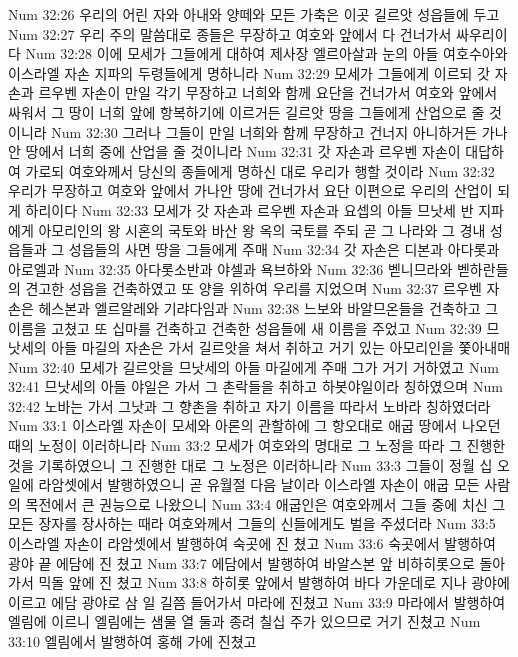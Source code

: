 Num 32:26  우리의 어린 자와 아내와 양떼와 모든 가축은 이곳 길르앗 성읍들에 두고
Num 32:27  우리 주의 말씀대로 종들은 무장하고 여호와 앞에서 다 건너가서 싸우리이다
Num 32:28  이에 모세가 그들에게 대하여 제사장 엘르아살과 눈의 아들 여호수아와 이스라엘 자손 지파의 두령들에게 명하니라
Num 32:29  모세가 그들에게 이르되 갓 자손과 르우벤 자손이 만일 각기 무장하고 너희와 함께 요단을 건너가서 여호와 앞에서 싸워서 그 땅이 너희 앞에 항복하기에 이르거든 길르앗 땅을 그들에게 산업으로 줄 것이니라
Num 32:30  그러나 그들이 만일 너희와 함께 무장하고 건너지 아니하거든 가나안 땅에서 너희 중에 산업을 줄 것이니라
Num 32:31  갓 자손과 르우벤 자손이 대답하여 가로되 여호와께서 당신의 종들에게 명하신 대로 우리가 행할 것이라
Num 32:32  우리가 무장하고 여호와 앞에서 가나안 땅에 건너가서 요단 이편으로 우리의 산업이 되게 하리이다
Num 32:33  모세가 갓 자손과 르우벤 자손과 요셉의 아들 므낫세 반 지파에게 아모리인의 왕 시혼의 국토와 바산 왕 옥의 국토를 주되 곧 그 나라와 그 경내 성읍들과 그 성읍들의 사면 땅을 그들에게 주매
Num 32:34  갓 자손은 디본과 아다롯과 아로엘과
Num 32:35  아다롯소반과 야셀과 욕브하와
Num 32:36  벧니므라와 벧하란들의 견고한 성읍을 건축하였고 또 양을 위하여 우리를 지었으며
Num 32:37  르우벤 자손은 헤스본과 엘르알레와 기랴다임과
Num 32:38  느보와 바알므온들을 건축하고 그 이름을 고쳤고 또 십마를 건축하고 건축한 성읍들에 새 이름을 주었고
Num 32:39  므낫세의 아들 마길의 자손은 가서 길르앗을 쳐서 취하고 거기 있는 아모리인을 쫓아내매
Num 32:40  모세가 길르앗을 므낫세의 아들 마길에게 주매 그가 거기 거하였고
Num 32:41  므낫세의 아들 야일은 가서 그 촌락들을 취하고 하봇야일이라 칭하였으며
Num 32:42  노바는 가서 그낫과 그 향촌을 취하고 자기 이름을 따라서 노바라 칭하였더라
Num 33:1  이스라엘 자손이 모세와 아론의 관할하에 그 항오대로 애굽 땅에서 나오던 때의 노정이 이러하니라
Num 33:2  모세가 여호와의 명대로 그 노정을 따라 그 진행한 것을 기록하였으니 그 진행한 대로 그 노정은 이러하니라
Num 33:3  그들이 정월 십 오 일에 라암셋에서 발행하였으니 곧 유월절 다음 날이라 이스라엘 자손이 애굽 모든 사람의 목전에서 큰 권능으로 나왔으니
Num 33:4  애굽인은 여호와께서 그들 중에 치신 그 모든 장자를 장사하는 때라 여호와께서 그들의 신들에게도 벌을 주셨더라
Num 33:5  이스라엘 자손이 라암셋에서 발행하여 숙곳에 진 쳤고
Num 33:6  숙곳에서 발행하여 광야 끝 에담에 진 쳤고
Num 33:7  에담에서 발행하여 바알스본 앞 비하히롯으로 돌아가서 믹돌 앞에 진 쳤고
Num 33:8  하히롯 앞에서 발행하여 바다 가운데로 지나 광야에 이르고 에담 광야로 삼 일 길쯤 들어가서 마라에 진쳤고
Num 33:9  마라에서 발행하여 엘림에 이르니 엘림에는 샘물 열 둘과 종려 칠십 주가 있으므로 거기 진쳤고
Num 33:10  엘림에서 발행하여 홍해 가에 진쳤고

